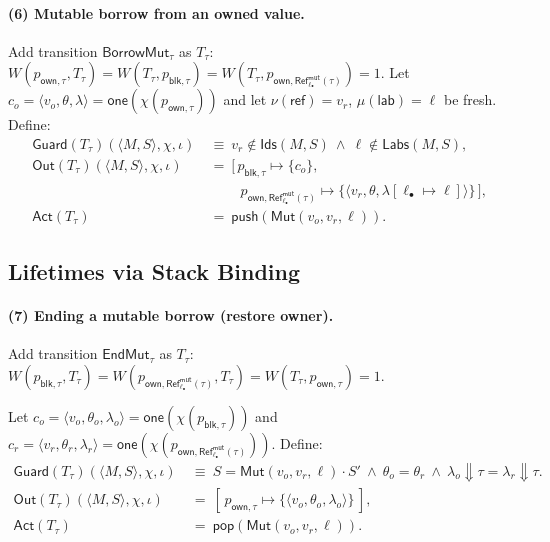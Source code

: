 \documentclass[runningheads]{llncs}
\newcommand{\LamCut}[2]{#1\Downarrow #2}
\begin{document}
\paragraph{(6) Mutable borrow from an owned value.}
Add transition $\mathsf{BorrowMut}_\tau$ as $T_\tau$: \\
$W(p_{\mathsf{own},\tau},T_\tau)=W(T_\tau,p_{\mathsf{blk},\tau})=
W(T_\tau,p_{\mathsf{own},\mathsf{Ref}^{\mathsf{mut}}_{\ell_{\bullet}}(\tau)})=1.$
Let $c_o=\langle v_o,\theta,\lambda\rangle=\mathsf{one}(\chi(p_{\mathsf{own},\tau}))$ and let
$\nu(\mathsf{ref})=v_r$, $\mu(\mathsf{lab})=\ell$ be fresh.
Define:
\begin{align*}
\mathsf{Guard}(T_\tau)(\langle M,S\rangle,\chi,\iota)
&~\equiv~ v_r\notin \mathsf{Ids}(M,S)\ \wedge\ \ell\notin \mathsf{Labs}(M,S),\\
\mathsf{Out}(T_\tau)(\langle M,S\rangle,\chi,\iota)
&~=~ [\,p_{\mathsf{blk},\tau}\mapsto \{c_o\},\\
&\qquad\ \ p_{\mathsf{own},\mathsf{Ref}^{\mathsf{mut}}_{\ell_{\bullet}}(\tau)}\mapsto
\{\langle v_r,\theta,\lambda[\ell_{\bullet}\mapsto \ell]\rangle\}\,],\\
\mathsf{Act}(T_\tau)
&~=~ \mathsf{push}(\mathsf{Mut}(v_o,v_r,\ell)).
\end{align*}

\subsection{Lifetimes via Stack Binding}
\label{sec:method:lifetime}
\paragraph{(7) Ending a mutable borrow (restore owner).}
Add transition $\mathsf{EndMut}_\tau$ as $T_\tau$: \\
$W(p_{\mathsf{blk},\tau},T_\tau)=W(p_{\mathsf{own},\mathsf{Ref}^{\mathsf{mut}}_{\ell_{\bullet}}(\tau)},T_\tau)=
W(T_\tau,p_{\mathsf{own},\tau})=1.$

Let $c_o=\langle v_o,\theta_o,\lambda_o\rangle=\mathsf{one}(\chi(p_{\mathsf{blk},\tau}))$ and
$c_r=\langle v_r,\theta_r,\lambda_r\rangle=\mathsf{one}(\chi(p_{\mathsf{own},\mathsf{Ref}^{\mathsf{mut}}_{\ell_{\bullet}}(\tau)}))$.
Define:
\begin{align*}
\mathsf{Guard}(T_\tau)(\langle M,S\rangle,\chi,\iota)
& ~\equiv~ S = \mathsf{Mut}(v_o,v_r,\ell)\cdot S'
\ \wedge\ \theta_o=\theta_r
\ \wedge\ \LamCut{\lambda_o}{\tau} = \LamCut{\lambda_r}{\tau}. \\
\mathsf{Out}(T_\tau)(\langle M,S\rangle,\chi,\iota)
&~=~ [\,p_{\mathsf{own},\tau}\mapsto \{\langle v_o,\theta_o,\lambda_o\rangle\}\,],\\
\mathsf{Act}(T_\tau)
&~=~ \mathsf{pop}(\mathsf{Mut}(v_o,v_r,\ell)).
\end{align*}
\end{document}
